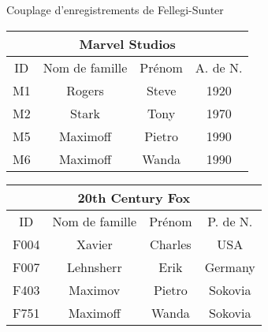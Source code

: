 
\begin{frame}{\Large Couplage d'enregistrements de Fellegi-Sunter}

\vskip 0.5cm

\tiny
\begin{multicols}{2}
	\begin{flushleft}
	\begin{tabular}{|c|c|c||c|}
	\hline
		\multicolumn{4}{|c|}{Marvel Studios} \\
	\hline
		ID & Nom de famille & Pr\'enom & A. de N. \\
	\hline
		\rowcolor{bgOrange}
		M1 & Rogers & Steve & 1920 \\
	\hline
		\rowcolor{bgOrange}
		M2 & Stark & Tony & 1970 \\
	\hline
		\rowcolor{bgOrange}
		M5 & Maximo{\color{red}ff} & Pietro & 1990 \\
	\hline
		\rowcolor{bgOrange}
		M6 & Maximo{\color{red}ff} & Wanda & 1990 \\
	\hline
	\end{tabular}
	\end{flushleft}
\columnbreak
	\begin{flushright}
	\begin{tabular}{|c|c|c||c|}
	\hline
		\multicolumn{4}{|c|}{20th Century Fox} \\
	\hline
		ID & Nom de famille & Pr\'enom & P. de N. \\
	\hline
		\rowcolor{lightTurquoise}
		F004 & Xavier & Charles & USA \\
	\hline
		\rowcolor{lightTurquoise}
		F007 & Lehnsherr & Erik & Germany \\
	\hline
		\rowcolor{lightTurquoise}
		F403 & Maximo{\color{red}v} & Pietro & Sokovia \\
	\hline
		\rowcolor{lightTurquoise}
		F751 & Maximo{\color{red}ff} & Wanda & Sokovia \\
	\hline
	\end{tabular}
	\end{flushright}
\end{multicols}

\vskip -0.5cm
\mbox{}

\pause

\tiny


\end{frame}
